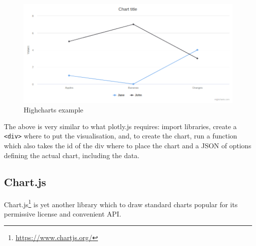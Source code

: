 \documentclass[
]{krantz}
\renewcommand{\href}[2]{#2\footnote{\url{#1}}}
\begin{document}
\begin{figure}
\centering
\includegraphics{images/candidate-highcharts.png}
\caption{Highcharts example}
\end{figure}

The above is very similar to what plotly.js requires: import libraries, create a \texttt{\textless{}div\textgreater{}} where to put the visualisation, and, to create the chart, run a function which also takes the id of the div where to place the chart and a JSON of options defining the actual chart, including the data.

\hypertarget{chart.js}{%
\subsection{Chart.js}\label{chart.js}}

\href{https://www.chartjs.org/}{Chart.js} is yet another library which to draw standard charts popular for its permissive license and convenient API.
\end{document}
